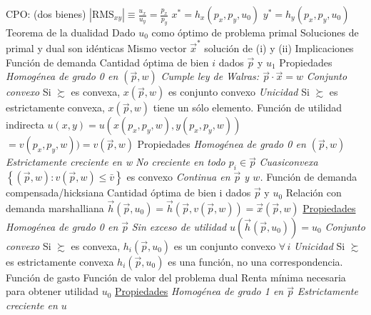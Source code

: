 \documentclass{nuevotema}
\begin{document}
\begin{esquemal}
				\4[] CPO: (dos bienes) $\left| \text{RMS}_{xy} \right| \equiv \frac{u_x}{u_y} = \frac{p_x}{p_y}$
				\4[$\Rightarrow$] $x^*=h_x(p_x,p_y, u_0)$
				\4[$\Rightarrow$] $y^*=h_y(p_x,p_y, u_0)$
			\3 Teorema de la dualidad
				\4 Dado $u_0$ como óptimo de problema primal
				\4[] Soluciones de primal y dual son idénticas
				\4 Mismo vector $\vec{x}^*$ solución de (i) y (ii)
		\2 Implicaciones
			\3 Función de demanda
				\4 Cantidad óptima de bien $i$ dados $\vec{p}$ y $u_1$
				\4[] 
				\4 Propiedades
				\4[(i)] \textit{Homogénea de grado 0 en $\left( \vec{p}, w \right)$}
				\4[(ii)] \textit{Cumple ley de Walras: $\vec{p} \cdot \vec{x} = w$}
				\4[(iii)] \textit{Conjunto convexo}
				\4[] Si $\succsim$ es convexa, $x(\vec{p},w)$ es conjunto convexo
				\4[(iii')] \textit{Unicidad}
				\4[] Si $\succsim$ es estrictamente convexa,
				\4[] $x(\vec{p},w)$ tiene un sólo elemento.
			\3 Función de utilidad indirecta
				\4[] $u (x, y) = u\left( x(p_x,p_y, w), y(p_x, p_y, w) \right)$
				\4[] $ =v(p_x, p_y, w)) = v(\vec{p}, w)$
				\4[] 
				\4 Propiedades
				\4[(i)] \textit{Homogénea de grado 0 en $\left( \vec{p}, w \right)$}
				\4[(ii)] \textit{Estrictamente creciente en w}
				\4[(iii)] \textit{No creciente en todo $p_i \in \vec{p}$}
				\4[(iv)] \textit{Cuasiconvexa}
				\4[] $\left\lbrace (\vec{p}, w): v( \vec{p},w) \leq \bar{v} \right\rbrace$ es convexo
				\4[(v)] \textit{Continua en $\vec{p}$ y $w$.}
			\3 Función de demanda compensada/hicksiana
				\4 Cantidad óptima de bien i dados $\vec{p}$ y $u_0$
				\4[] 
				\4 {Relación con demanda marshalliana}
				\4[] $\vec{h}(\vec{p},u_0) = \vec{h} \left( \vec{p}, v(\vec{p},w ) \right) = \vec{x}(\vec{p},w)$
				\4 \underline{Propiedades}
				\4[(i)] \textit{Homogénea de grado 0 en $\vec{p}$}
				\4[(ii)] \textit{Sin exceso de utilidad}
				\4[] $u( \vec{h} (\vec{p}, u_0)) = u_0$
				\4[(iii)] \textit{Conjunto convexo}
				\4[] Si $\succsim$ es convexa,
				\4[] $h_i(\vec{p},u_0)$ es un conjunto convexo $\forall \, i$
				\4[(iii')] \textit{Unicidad}
				\4[] Si $\succsim$ es estrictamente convexa
				\4[] $h_i(\vec{p}, u_0)$ es una función, no una correspondencia.
			\3 Función de gasto
				\4 Función de valor del problema dual
				\4[$\rightarrow$] Renta mínima necesaria para obtener utilidad $u_0$
				\4[] 
				\4 \underline{Propiedades}
				\4[(i)] \textit{Homogénea de grado 1 en $\vec{p}$}
				\4[(ii)] \textit{Estrictamente creciente en $u$}

\end{esquemal}
\end{document}
